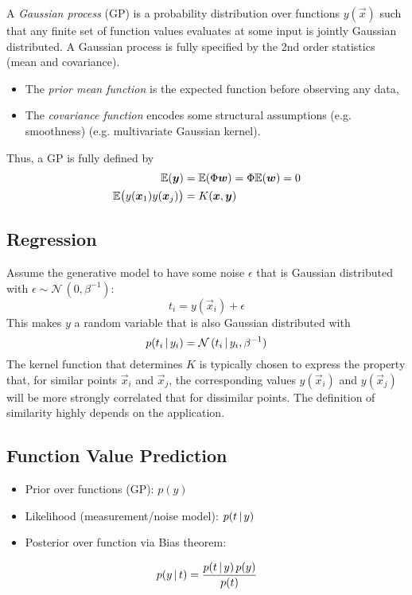 		A \emph{Gaussian process} (GP) is a probability distribution over functions \(y(\vec{x})\) such that any finite set of function values evaluates at some input is jointly Gaussian distributed. A Gaussian process is fully specified by the 2nd order statistics (mean and covariance).
		\begin{itemize}
			\item The \emph{prior mean function} is the expected function before observing any data,
			\item The \emph{covariance function} encodes some structural assumptions (e.g. smoothness) (e.g. multivariate Gaussian kernel).
		\end{itemize}
		Thus, a GP is fully defined by
		\begin{align}
			\mathbb{E}(\bm{y})                             & = \mathbb{E}(\Phi\bm{w}) = \Phi \mathbb{E}(\bm{w}) = 0 \\
			\mathbb{E}\big( y(\bm{x}_1) y(\bm{x}_j) \big) & = K(\bm{x}, \bm{y})
		\end{align}

		\subsection{Regression}
			Assume the generative model to have some noise \(\epsilon\) that is Gaussian distributed with \( \epsilon \sim \mathcal{N}\,(0, \beta^{-1}) \):
			\begin{equation}
				t_i = y(\vec{x}_i) + \epsilon
			\end{equation}
			This makes \(y\) a random variable that is also Gaussian distributed with
			\begin{equation}
				p(t_i \,\vert\, y_i) = \mathcal{N}\,(t_i \,\vert\, y_i, \beta^{-1})
			\end{equation}
			The kernel function that determines \(K\) is typically chosen to express the property that, for similar points \( \vec{x}_i \) and \( \vec{x}_j \), the corresponding values \( y(\vec{x}_i) \) and \( y(\vec{x}_j) \) will be more strongly correlated that for dissimilar points. The definition of similarity highly depends on the application.

		\subsection{Function Value Prediction}
			\begin{itemize}
				\item Prior over functions (GP): \( p(y) \)
				\item Likelihood (measurement/noise model): \( p(t \,\vert\, y) \)
				\item Posterior over function via Bias theorem:
			\end{itemize}
			\begin{equation}
				p(y \,\vert\, t) = \frac{p(t \,\vert\, y) \, p(y)}{p(t)}
			\end{equation}

